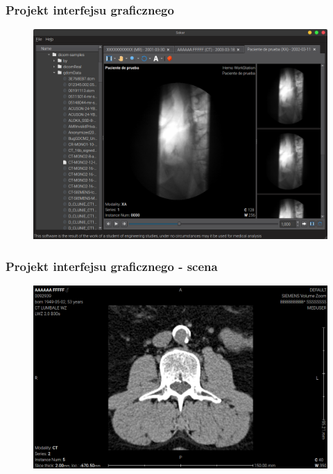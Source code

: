 \documentclass[aspectratio=169]{beamer}
\begin{document}
\begin{frame}
    \frametitle{Projekt interfejsu graficznego}
    \begin{figure}
        \includegraphics[height=0.8\textheight]{img/sokar-gui-002.png}
    \end{figure}
\end{frame}

\begin{frame}
    \frametitle{Projekt interfejsu graficznego - scena}
    \begin{figure}
        \includegraphics[height=0.8\textheight]{img/sokar-gui-003.png}
    \end{figure}
\end{frame}
\end{document}
